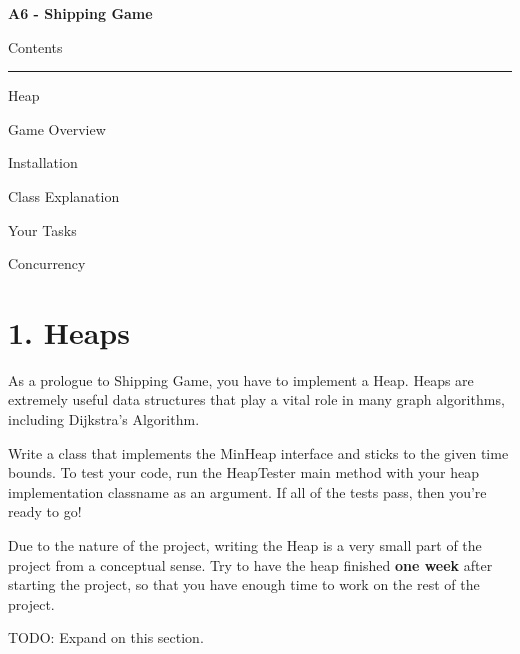 \documentclass[11pt]{article}
\begin{document}
\begin{center}
\begin{HUGE}{\bf A6 - Shipping Game}\\ \end{HUGE}
\vspace{10mm}
\begin{LARGE} Contents\\ \end{LARGE}
\noindent\rule{8cm}{0.4pt}
\begin{enumerate} \begin{large}
\item Heap
\item Game Overview
\item Installation
\item Class Explanation
\item Your Tasks
\item Concurrency
\end{large}\end{enumerate}
\end{center}
\newpage

\section{1. Heaps}
As a prologue to Shipping Game, you have to implement a Heap. Heaps are extremely useful data structures that play a vital role in many graph algorithms, including Dijkstra's Algorithm.

Write a class that implements the MinHeap interface and sticks to the given time bounds. To test your code, run the HeapTester main method with your heap implementation classname as an argument. If all of the tests pass, then you're ready to go!

Due to the nature of the project, writing the Heap is a very small part of the project from a conceptual sense. Try to have the heap finished \textbf{one week} after starting the project, so that you have enough time to work on the rest of the project.

TODO: Expand on this section.



\newpage
\end{document}
